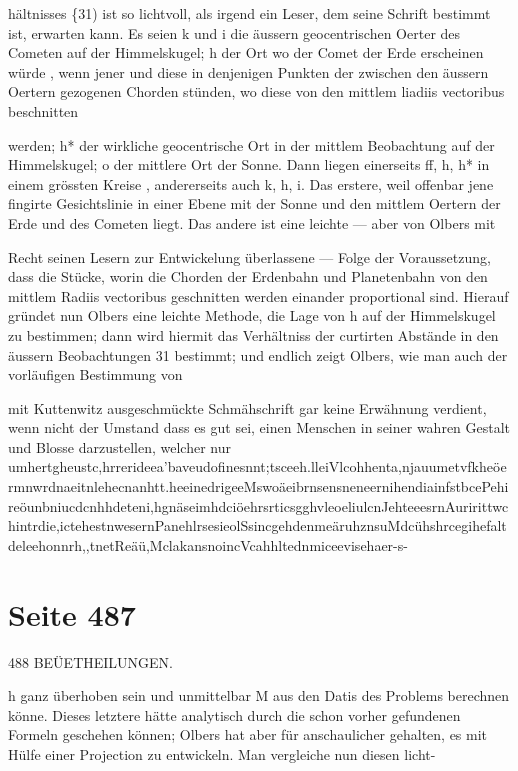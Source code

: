 \documentclass[10pt,a4paper]{article}
\begin{document}
hältnisses \{31) ist so lichtvoll, als irgend ein Leser, dem seine Schrift bestimmt ist, erwarten kann. Es seien k und i die äussern geocentrischen Oerter des Cometen auf der Himmelskugel; h der Ort wo der Comet der Erde erscheinen würde , wenn jener und diese in denjenigen Punkten der zwischen den äussern Oertern gezogenen Chorden stünden, wo diese von den mittlem liadiis vectoribus beschnitten

werden; h* der wirkliche geocentrische Ort in der mittlem Beobachtung auf der Himmelskugel; o der mittlere Ort der Sonne. Dann liegen einerseits ff, h, h* in einem grössten Kreise , andererseits auch k, h, i. Das erstere, weil offenbar jene fingirte Gesichtslinie in einer Ebene mit der Sonne und den mittlem Oertern der Erde und des Cometen liegt. Das andere ist eine leichte — aber von Olbers mit

Recht seinen Lesern zur Entwickelung überlassene — Folge der Voraussetzung, dass die Stücke, worin die Chorden der Erdenbahn und Planetenbahn von den mittlem Radiis vectoribus geschnitten werden einander proportional sind. Hierauf gründet nun Olbers eine leichte Methode, die Lage von h auf der Himmelskugel zu bestimmen; dann wird hiermit das Verhältniss der curtirten Abstände in den äussern Beobachtungen 31 bestimmt; und endlich zeigt Olbers, wie man auch der vorläufigen Bestimmung von

mit Kuttenwitz ausgeschmückte Schmähschrift gar keine Erwähnung verdient, wenn nicht der Umstand dass es gut sei, einen Menschen in seiner wahren Gestalt und Blosse darzustellen, welcher nur umhertgheustc,hrrerideea'baveudofinesnnt;tsceeh.lleiVlcohhenta,njauumetvfkheöermnwrdnaeitnlehecnanhtt.heeinedrigeeMswoäeibrnsensneneernihendiainfstbcePehireöunbniucdcnhhdeteni,hgnäseimhdciöehrsrticsgghvleoeliulcnJehteeesrnAuririttwchintrdie,ictehestnwesernPanehlrsesieolSsincgehdenmeäruhznsuMdcühshrcegihefaltdeleehonnrh,,tnetReäü,MclakansnoincVcahhltednmiceevisehaer-s-


\newpage
\section*{Seite 487}
488 BEÜETHEILUNGEN.

h ganz überhoben sein und unmittelbar M aus den Datis des Problems berechnen könne. Dieses letztere hätte analytisch durch die schon vorher gefundenen Formeln geschehen können; Olbers hat aber für anschaulicher gehalten, es mit Hülfe einer Projection zu entwickeln. Man vergleiche nun diesen licht-
\end{document}
